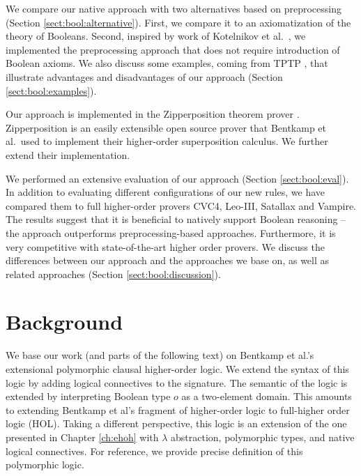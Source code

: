 We compare our native approach with two alternatives based on
preprocessing (Section \ref{sect:bool:alternative}). First, we compare it to  an
axiomatization of the theory of Booleans. Second, inspired by work of
Kotelnikov et al.\ \cite{kotelnikov-16-fool}, we implemented the preprocessing approach that does not
require introduction of Boolean axioms.
We also discuss some examples, coming from TPTP \cite{gs-17-tptp}, that
illustrate advantages and disadvantages of our approach (Section \ref{sect:bool:examples}).

Our approach is implemented in the Zipperposition theorem prover
\cite{sc-15-simon-phd,sc-supind-17}. Zipperposition is an easily
extensible open source prover that Bentkamp et al.\ used to implement their
higher-order superposition calculus. We further extend their implementation.

We performed an extensive evaluation of our approach (Section \ref{sect:bool:eval}).
In addition to evaluating different configurations of our new rules, we have
compared them to full higher-order provers CVC4, Leo-III,  Satallax and Vampire.
The results suggest that it is beneficial to natively support Boolean reasoning
-- the approach outperforms preprocessing-based approaches. Furthermore, it is
very competitive with state-of-the-art higher order provers. We discuss the differences between our approach and the
approaches we base on, as well as related approaches (Section
\ref{sect:bool:discussion}).


\section{Background} 
\label{sect:bool:background}

We base our work (and parts of the following text) on Bentkamp et al.'s \cite{bbtvw-21-sup-lam} extensional
polymorphic clausal higher-order logic. We extend the syntax of this logic by
adding logical connectives to the signature. The semantic of the logic
is extended by interpreting Boolean type $o$ as a two-element domain. This
amounts to extending Bentkamp et al's fragment of higher-order logic to
full-higher order logic (HOL). Taking a different perspective, this logic is an extension of the one
presented in Chapter \ref{ch:ehoh} with $\lambda$ abstraction, polymorphic
types, and native logical connectives. For reference, we provide precise definition of this polymorphic logic.


